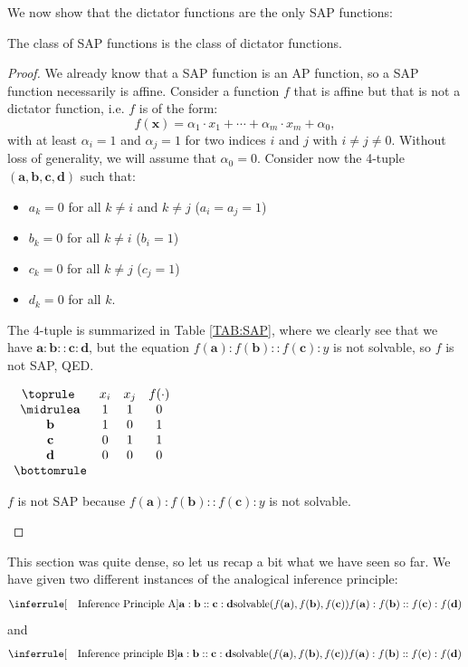We now show that the dictator functions are the only SAP functions:

\begin{proposition}
  The class of SAP functions is the class of dictator functions.
\end{proposition}
\begin{proof}
  We already know that a SAP function is an AP function, so a SAP function
  necessarily is affine. Consider a function $f$ that is affine but that is not
  a dictator function, i.e. $f$ is of the form:
  $$f(\mathbf{x}) = \alpha_1 \cdot x_1 + \cdots +\alpha_m \cdot x_m + \alpha_0,$$
  with at least $\alpha_i = 1$ and $\alpha_j = 1$ for two indices $i$ and $j$
  with $i\neq j \neq 0$. Without loss of generality, we will assume that
  $\alpha_0 = 0$.
  Consider now the 4-tuple $(\mathbf{a}, \mathbf{b}, \mathbf{c},
  \mathbf{d})$ such that:
  \begin{itemize}
    \item $a_k = 0$ for all $k \neq i$ and $k\neq j$ ($a_i = a_j = 1$)
    \item $b_k = 0$ for all $k \neq i$ ($b_i = 1$)
    \item $c_k = 0$ for all $k \neq j$ ($c_j = 1$)
    \item $d_k = 0$ for all $k$.
  \end{itemize}

  The 4-tuple is summarized in Table \ref{TAB:SAP}, where we clearly see
  that we have $\mathbf{a} : \mathbf{b} :: \mathbf{c} : \mathbf{d}$, but the
  equation $f(\mathbf{a}) : f(\mathbf{b}) :: f(\mathbf{c}) : y$ is not
  solvable,
  so $f$ is not SAP, QED.

\begin{table}[ht]
  \center
$\begin{array}{cccc}
  \toprule
  ~ & x_i & x_j & f(\cdot) \\
  \midrule
  \mathbf{a} & 1 & 1 & 0\\
  \mathbf{b} & 1 & 0 & 1\\
  \mathbf{c} & 0 & 1 & 1\\
  \mathbf{d} & 0 & 0 & 0\\
  \bottomrule
\end{array}
$\bigskip
\caption{$f$ is not SAP because $f(\mathbf{a}) : f(\mathbf{b}) :: f(\mathbf{c})
  : y$ is not solvable.}
\label{TAB:SAP}
\end{table}

\end{proof}

This section was quite dense, so let us recap a bit what we have seen so far.
We have given two different instances of the analogical inference principle:
$$
\inferrule[\text{~~ Inference Principle A}]{\mathbf{a} : \mathbf{b} ::
\mathbf{c} : \mathbf{d}}{\solvable(f(\mathbf{a}), f(\mathbf{b}),
f(\mathbf{c}))\\\\ f(\mathbf{a}) : f(\mathbf{b}) :: f(\mathbf{c}) :
f(\mathbf{d}) } $$
and
$$
\inferrule[\text{~~ Inference principle B}]{\mathbf{a} : \mathbf{b} ::
\mathbf{c} : \mathbf{d} \\\\ \solvable(f(\mathbf{a}), f(\mathbf{b}),
f(\mathbf{c}))}{f(\mathbf{a}) : f(\mathbf{b}) :: f(\mathbf{c}) : f(\mathbf{d})}
$$

